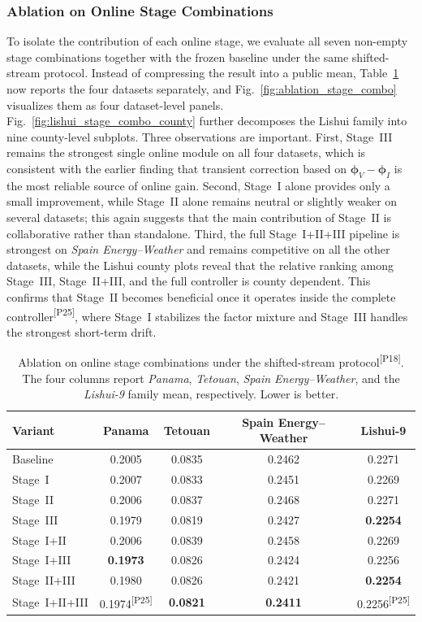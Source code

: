 ﻿\documentclass[journal]{IEEEtran}
\DeclareRobustCommand{\auditbad}[2]{{\color{auditred}#1}{\color{auditred}\textsuperscript{[#2]}}}
\begin{document}
\subsubsection{Ablation on Online Stage Combinations}
To isolate the contribution of each online stage, we evaluate all seven non-empty stage combinations together with the frozen baseline under the same shifted-stream protocol. Instead of compressing the result into a public mean, Table~\ref{tab:ablation_stage_combo} now reports the four datasets separately, and Fig.~\ref{fig:ablation_stage_combo} visualizes them as four dataset-level panels. Fig.~\ref{fig:lishui_stage_combo_county} further decomposes the Lishui family into nine county-level subplots. Three observations are important. First, Stage~III remains the strongest single online module on all four datasets, which is consistent with the earlier finding that transient correction based on $\boldsymbol{\phi}_V-\boldsymbol{\phi}_I$ is the most reliable source of online gain. Second, Stage~I alone provides only a small improvement, while Stage~II alone remains neutral or slightly weaker on several datasets; this again suggests that the main contribution of Stage~II is collaborative rather than standalone. Third, the full Stage~I+II+III pipeline is strongest on \textit{Spain Energy--Weather} and remains competitive on all the other datasets, while the Lishui county plots reveal that the relative ranking among Stage~III, Stage~II+III, and the full controller is county dependent. \auditbad{This confirms that Stage~II becomes beneficial once it operates inside the complete controller}{P25}, where Stage~I stabilizes the factor mixture and Stage~III handles the strongest short-term drift.

\begin{table}[t]
\caption{Ablation on online stage combinations under the \auditbad{shifted-stream protocol}{P18}. The four columns report \textit{Panama}, \textit{Tetouan}, \textit{Spain Energy--Weather}, and the \textit{Lishui-9} family mean, respectively. Lower is better.}
\label{tab:ablation_stage_combo}
\centering
\begin{tabular}{lcccc}
\toprule
Variant & Panama & Tetouan & Spain Energy--Weather & Lishui-9 \\
\midrule
Baseline & 0.2005 & 0.0835 & 0.2462 & 0.2271 \\
Stage~I & 0.2007 & 0.0833 & 0.2451 & 0.2269 \\
Stage~II & 0.2006 & 0.0837 & 0.2468 & 0.2271 \\
Stage~III & 0.1979 & 0.0819 & 0.2427 & \textbf{0.2254} \\
Stage~I+II & 0.2006 & 0.0839 & 0.2458 & 0.2269 \\
Stage~I+III & \textbf{0.1973} & 0.0826 & 0.2424 & 0.2256 \\
Stage~II+III & 0.1980 & 0.0826 & 0.2421 & \textbf{0.2254} \\
Stage~I+II+III & \auditbad{0.1974}{P25} & \textbf{0.0821} & \textbf{0.2411} & \auditbad{0.2256}{P25} \\
\bottomrule
\end{tabular}
\end{table}
\end{document}
